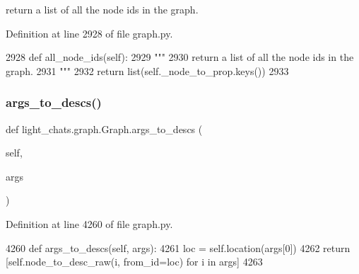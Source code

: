 \begin{DoxyVerb}return a list of all the node ids in the graph.
\end{DoxyVerb}
 

Definition at line 2928 of file graph.\+py.


\begin{DoxyCode}
2928     \textcolor{keyword}{def }all\_node\_ids(self):
2929         \textcolor{stringliteral}{"""}
2930 \textcolor{stringliteral}{        return a list of all the node ids in the graph.}
2931 \textcolor{stringliteral}{        """}
2932         \textcolor{keywordflow}{return} list(self.\_node\_to\_prop.keys())
2933 
\end{DoxyCode}
\mbox{\label{classlight__chats_1_1graph_1_1Graph_ad0c4f66ad462e7aa45324767c551030a}} 
\subsubsection{\texorpdfstring{args\+\_\+to\+\_\+descs()}{args\_to\_descs()}}
{\footnotesize\ttfamily def light\+\_\+chats.\+graph.\+Graph.\+args\+\_\+to\+\_\+descs (\begin{DoxyParamCaption}\item[{}]{self,  }\item[{}]{args }\end{DoxyParamCaption})}



Definition at line 4260 of file graph.\+py.


\begin{DoxyCode}
4260     \textcolor{keyword}{def }args\_to\_descs(self, args):
4261         loc = self.location(args[0])
4262         \textcolor{keywordflow}{return} [self.node\_to\_desc\_raw(i, from\_id=loc) \textcolor{keywordflow}{for} i \textcolor{keywordflow}{in} args]
4263 
\end{DoxyCode}
\mbox{\label{classlight__chats_1_1graph_1_1Graph_ae53a707683cac4ddbafbefb0e0130bfa}} 
